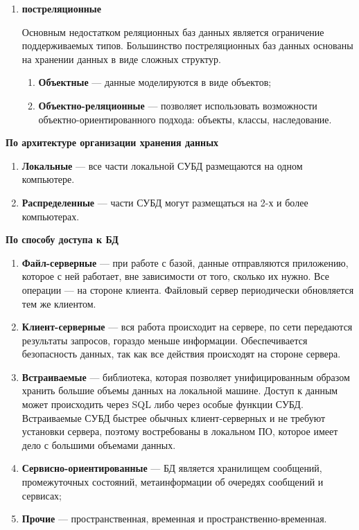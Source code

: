 \begin{enumerate}[label=\arabic*.]
\item \textbf{постреляционные~\cite{vinograd}}

	Основным недостатком реляционных баз данных является ограничение поддерживаемых типов. Большинство постреляционных баз данных основаны на хранении данных в виде сложных структур.
	\begin{enumerate}[label=\alph*.]
		\item \textbf{Объектные} --- данные моделируются в виде объектов;
		\item \textbf{Объектно-реляционные} --- позволяет использовать возможности объектно-ориентированного подхода: объекты, классы, наследование.
	\end{enumerate}
	
\end{enumerate}

\textbf{По архитектуре организации хранения данных}

\begin{enumerate}[label=\arabic*.]
	\item \textbf{Локальные} --- все части локальной СУБД размещаются на одном компьютере.
	\item \textbf{Распределенные} --- части СУБД могут размещаться на 2-х и более компьютерах. 
\end{enumerate}

\textbf{По способу доступа к БД}

\begin{enumerate}[label=\arabic*.]
	\item \textbf{Файл-серверные} --- при работе с базой, данные отправляются приложению, которое с ней работает, вне зависимости от того, сколько их нужно. Все операции --- на стороне клиента. Файловый сервер периодически обновляется тем же клиентом.
	\item \textbf{Клиент-серверные} --- вся работа происходит на сервере, по сети передаются результаты запросов, гораздо меньше информации. Обеспечивается безопасность данных, так как все действия происходят на стороне сервера.
	\item \textbf{Встраиваемые} --- библиотека, которая позволяет унифицированным образом хранить большие объемы данных на локальной машине. Доступ к данным может происходить через SQL либо через особые функции СУБД. Встраиваемые СУБД быстрее обычных клиент-серверных и не требуют установки сервера, поэтому востребованы в локальном ПО, которое имеет дело с большими объемами данных.
	\item \textbf{Сервисно-ориентированные} --- БД является хранилищем сообщений, промежуточных состояний, метаинформации об очередях сообщений и сервисах;
	\item \textbf{Прочие} --- пространственная, временная и пространственно-временная.
\end{enumerate}

